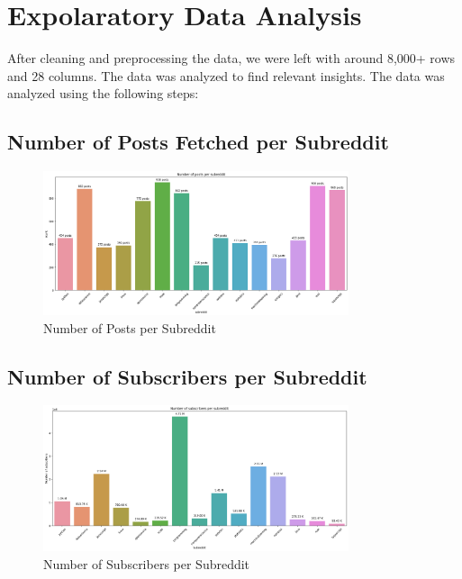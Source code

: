 \documentclass[12pt, letterpage]{article}
\begin{document}
\pagebreak
\section{Expolaratory Data Analysis}

After cleaning and preprocessing the data, we were left with around 8,000+ rows and 28 columns. The data was analyzed to find relevant insights. The data was analyzed using the following steps: 

\subsection*{Number of Posts Fetched per Subreddit}
\begin{figure}[H]
    \centering
    \includegraphics[width=0.8\textwidth]{num_posts_per_subreddit.png}
    \caption{Number of Posts per Subreddit}
    \label{fig:posts_per_subreddit}
\end{figure}

\subsection*{Number of Subscribers per Subreddit}
\begin{figure}[H]
    \centering
    \includegraphics[width=0.8\textwidth]{num_subscribers_per_subreddit.png}
    \caption{Number of Subscribers per Subreddit}
    \label{fig:subscribers_per_subreddit}
\end{figure}
\end{document}
